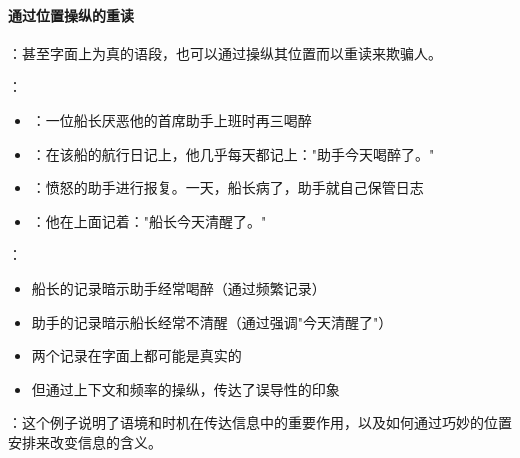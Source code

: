 \paragraph{通过位置操纵的重读}
\begin{examplebox}[title=通过位置操纵的重读]
：甚至字面上为真的语段，也可以通过操纵其位置而以重读来欺骗人。

：
\begin{itemize}
  \item {}：一位船长厌恶他的首席助手上班时再三喝醉
  \item {}：在该船的航行日记上，他几乎每天都记上："助手今天喝醉了。"
  \item {}：愤怒的助手进行报复。一天，船长病了，助手就自己保管日志
  \item {}：他在上面记着："船长今天清醒了。"
\end{itemize}

：
\begin{itemize}
  \item 船长的记录暗示助手经常喝醉（通过频繁记录）
  \item 助手的记录暗示船长经常不清醒（通过强调"今天清醒了"）
  \item 两个记录在字面上都可能是真实的
  \item 但通过上下文和频率的操纵，传达了误导性的印象
\end{itemize}

：这个例子说明了语境和时机在传达信息中的重要作用，以及如何通过巧妙的位置安排来改变信息的含义。
\end{examplebox}